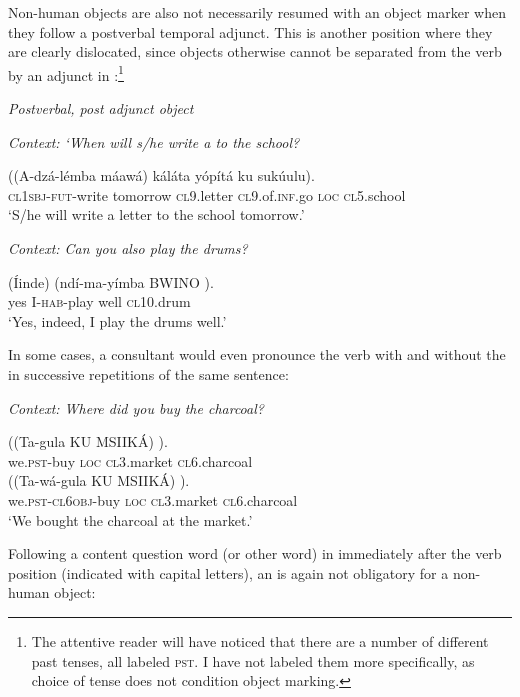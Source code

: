 \documentclass[output=paper]{LSP/langsci}
\begin{document}
Non-human objects are also not necessarily resumed with an object
marker when they follow a postverbal temporal adjunct. This is another
position where they are clearly dislocated, since objects otherwise
cannot be separated from the verb by an adjunct in 
\citep{Mchombo2004Syntax}:\footnote{The attentive reader will have noticed that there are a number of different past tenses, all labeled \textsc{pst}. I have
 not labeled them more specifically, as choice of tense does not
 condition object marking.}
 
\begin{exe}
\ex
\label{02-do-ex:19-20:Chichewa}
\emph{Postverbal, post adjunct object}\\
\begin{xlist}

\ex 	\emph{Context: ‘When will s/he write a 	 to the school?} %

\gll ((A-dzá-lémba 		máawá) 		káláta 		yópítá 			ku 	sukúulu).\\
	 \textsc{cl1sbj}-\textsc{fut}-write		tomorrow	\textsc{cl9}.letter		\textsc{cl9}.of.\textsc{inf}.go	\textsc{loc}	\textsc{cl5}.school\\
\glt ‘S/he will write a letter to the school tomorrow.’

\ex 	\emph{Context: Can you also play the drums?} %

\gll (Íinde) 	(ndí-ma-yímba 	BWINO 	).\\
	 yes		I-\textsc{hab}-play			well		\textsc{cl10}.drum\\
\glt ‘Yes, indeed, I play the drums well.’
\end{xlist}
\end{exe}

In some cases, a consultant would even pronounce the verb with and without the  in successive repetitions of the same sentence:

{
\begin{exe}
\ex
\label{02-do-ex:21}%
\begin{xlist}

\ex \emph{Context: Where did you buy the charcoal?}

\gll ((Ta-gula 			KU MSIIKÁ) 			).\\
	 we.\textsc{pst}-buy	\textsc{loc} \textsc{cl3}.market		\textsc{cl6}.charcoal\\

\ex 
\gll ((Ta-wá-gula 			KU MSIIKÁ) 		).\\
	 we.\textsc{pst}-\textsc{cl6obj}-buy	\textsc{loc} \textsc{cl3}.market		\textsc{cl6}.charcoal\\
\glt ‘We bought the charcoal at the market.’
\end{xlist}
\end{exe}
}
Following a content question word (or other word) in immediately after the verb position (indicated with capital letters), an  is again not obligatory for a non-human object:
\end{document}
